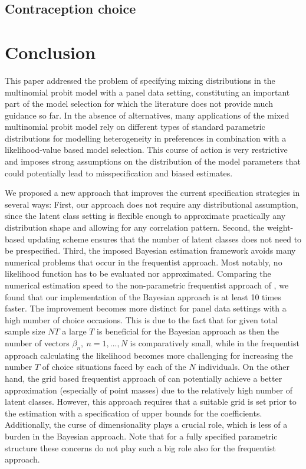 \documentclass[article]{jss}
\begin{document}
\subsection{Contraception choice} \label{subsec:contraception_choice}


\section{Conclusion} \label{sec:conclusion}

This paper addressed the problem of specifying mixing distributions in the multinomial probit model with a panel data setting, constituting an important part of the model selection for which the literature does not provide much guidance so far. In the absence of alternatives, many applications of the mixed multinomial probit model rely on different types of standard parametric distributions for modelling heterogeneity in preferences in combination with a likelihood-value based model selection. This course of action is very restrictive and imposes strong assumptions on the distribution of the model parameters that could potentially lead to misspecification and biased estimates.

We proposed a new approach that improves the current specification strategies in several ways: First, our approach does not require any distributional assumption, since the latent class setting is flexible enough to approximate practically any distribution shape and allowing for any correlation pattern. Second, the weight-based updating scheme ensures that the number of latent classes does not need to be prespecified. Third, the imposed Bayesian estimation framework avoids many numerical problems that occur in the frequentist approach. Most notably, no likelihood function has to be evaluated nor approximated. Comparing the numerical estimation speed to the non-parametric frequentist approach of \cite{Bauer:2019}, we found that our implementation of the Bayesian approach is at least 10 times faster. The improvement becomes more distinct for panel data settings with a high number of choice occasions. This is due to the fact that for given total sample size $NT$ a large $T$ is beneficial for the Bayesian approach as then the number of vectors $\beta_n,~ n = 1,...,N$ is comparatively small, while in the frequentist approach calculating the likelihood becomes more challenging for increasing the number $T$ of choice situations faced by each of the $N$ individuals. On the other hand, the grid based frequentist approach of \cite{Bauer:2019} can potentially achieve a better approximation (especially of point masses) due to the relatively high number of latent classes. However, this approach requires that a suitable grid is set prior to the estimation with a specification of upper bounds for the coefficients. Additionally, the curse of dimensionality plays a crucial role, which is less of a burden in the Bayesian approach. Note that for a fully specified parametric structure these concerns do not play such a big role also for the frequentist approach.
\end{document}
